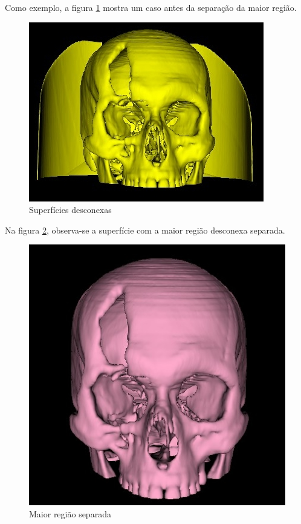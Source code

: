 Como exemplo, a figura \ref{fig:extract_most_region_1} mostra um caso antes da separação
da maior região.

\begin{figure}[!htb]
\centering
\includegraphics[scale=0.3]{../user_guide_figures/invesalius_screen/surface_extract_most_region_1.jpg}
\caption{Superfícies desconexas}
\label{fig:extract_most_region_1}
\end{figure}

Na figura \ref{fig:extract_most_region2}, observa-se a superfície com a maior região
desconexa separada.

\begin{figure}[!htb]
\centering
\includegraphics[scale=0.3]{../user_guide_figures/invesalius_screen/surface_extract_most_region2.jpg}
\caption{Maior região separada}
\label{fig:extract_most_region2}
\end{figure}


